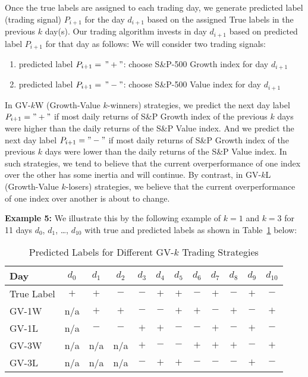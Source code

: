 \documentclass{article}
\begin{document}
Once the true labels are assigned to each trading day, we generate predicted label (trading signal) $P_{i+1}$ for the day $d_{i+1}$ based on the assigned True labels in the previous $k$ day(s). 
Our trading algorithm invests in day $d_{i+1}$ based on predicted label $P_{i+1}$ for that day as follows:
We will consider two trading signals:
\medskip
\begin{enumerate}[nosep]
    \item predicted label $P_{i+1}=\, "+"$: choose S{\&}P-500 Growth index for day $d_{i+1}$
    \item predicted label $P_{i+1}=\, "-"$: choose S{\&}P-500 Value index for day $d_{i+1}$
\end{enumerate}
\medskip
In GV-$k$W (Growth-Value $k$-winners) strategies, we predict the next day label $P_{i+1}="+"$ if most daily returns of S{\&}P Growth index of the previous $k$ days were higher than the daily returns of the S{\&}P Value index. And we predict the next day label $P_{i+1}="-"$ if most daily returns of S{\&}P Growth index of the previous $k$ days were lower than the daily returns of the S{\&}P Value index.
In such strategies, we tend to believe that the current overperformance of one index over the other has some inertia and will continue. By contrast, in GV-$k$L (Growth-Value $k$-losers) strategies, we believe that the current overperformance of one index over another is about to change.

\medskip
\noindent
{\bf Example 5: } We illustrate this by the following example of $k=1$ and $k=3$ for 11 days $d_{0}$, $d_{1}$, \ldots, $d_{10}$ with
true and predicted labels as shown in Table~\ref{tab_signals_gv_11} below:

\begin{table}[!ht]
    \centering
    \caption{Predicted Labels for Different GV-$k$ Trading Strategies}
    \vspace{0.1in}
    \begin{tabular}{l | c c c c c  c c c c c c}
    \hline
        Day & $d_{0}$ & $d_{1}$ & $d_{2}$ & $d_{3}$ & $d_{4}$ & $d_{5}$ & $d_{6}$ & $d_{7}$ & $d_{8}$ & $d_{9}$ & $d_{10}$ \\ \hline
       True Label  & $+$ & $+$ & $-$ & $-$ & $+$ & $+$ & $-$ & $+$ & $-$ & $+$ & $-$\\
 GV-1W     & n/a & $+$ & $+$ & $-$ & $-$ & $+$ & $+$ & $-$ & $+$ & $-$ & $+$\\
 GV-1L     & n/a & $-$ & $-$ & $+$ & $+$ & $-$ & $-$ & $+$ & $-$ & $+$ & $-$\\
 GV-3W & n/a & n/a & n/a & $+$ & $-$ & $-$ & $+$ & $+$ & $+$ & $-$ & $+$\\
 GV-3L & n/a & n/a & n/a & $-$ & $+$ & $+$ & $-$ & $-$ & $-$ & $+$ & $-$\\
        \hline
\end{tabular}
\label{tab_signals_gv_11}
\end{table}
\end{document}
